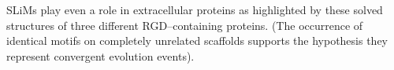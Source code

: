 \documentclass{beamer}
\begin{document}
\begin{frame}
    SLiMs play even a role in extracellular proteins as highlighted by these solved structures of three different RGD--containing proteins. 
    (The occurrence of identical motifs on completely unrelated scaffolds supports the hypothesis they represent convergent evolution events).\\
    \begin{center}

\end{center}
\end{frame}
\end{document}
